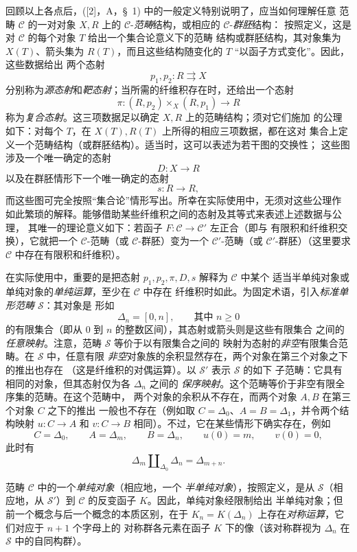 回顾以上各点后，([2]，A，\S~1) 中的一般定义特别说明了，应当如何理解任意
范畴 $\mathcal C$ 的一对对象 $X,R$ 上的
$\mathcal C$-\emph{范畴}结构，或相应的 $\mathcal C$-\emph{群胚}结构：
按照定义，这是对 $\mathcal C$ 的每个对象 $T$ 给出一个集合论意义下的范畴
结构或群胚结构，其对象集为 $X(T)$、箭头集为 $R(T)$，而且这些结构随变化的
$T$ “以函子方式变化”。因此，这些数据给出
两个态射
\[
  p_1,p_2:R\rightrightarrows X
\]
分别称为\emph{源态射}和\emph{靶态射}；当所需的纤维积存在时，还给出一个态射
\[
  \pi:(R,p_2)\times_X(R,p_1)\longrightarrow R
\]
称为\emph{复合态射}。这三项数据足以确定 $X,R$ 上的范畴结构；须对它们施加
的公理如下：对每个 $T$，在 $X(T),R(T)$ 上所得的相应三项数据，都在这对
集合上定义一个范畴结构（或群胚结构）。适当时，这可以表述为若干图的交换性；
这些图涉及一个唯一确定的态射
\[
  D:X\longrightarrow R
\]
以及在群胚情形下一个唯一确定的态射
\[
  s:R\longrightarrow R,
\]
而这些图可完全按照“集合论”情形写出。所幸在实际使用中，无须对这些公理作
如此繁琐的解释。能够借助某些纤维积之间的态射及其等式来表述上述数据与公理，
其唯一的理论意义如下：若函子 $F:\mathcal C\to\mathcal C'$ 左正合（即与
有限积和纤维积交换），它就把一个 $\mathcal C$-范畴（或
$\mathcal C$-群胚）变为一个 $\mathcal C'$-范畴（或
$\mathcal C'$-群胚）（这里要求 $\mathcal C$ 中存在有限积和纤维积）。

在实际使用中，重要的是把态射 $p_1,p_2,\pi,D,s$ 解释为 $\mathcal C$ 中某个
适当半单纯对象或单纯对象的\emph{单纯运算}，至少在 $\mathcal C$ 中存在
纤维积时如此。为固定术语，引入\emph{标准单形范畴 $\mathcal S$}：其对象是
形如
\[
  \Delta_n=[0,n],\qquad\text{其中 }n\geq 0
\]
的有限集合（即从 $0$ 到 $n$ 的整数区间），其态射或箭头则是这些有限集合
之间的\emph{任意映射}。注意，范畴 $\mathcal S$ 等价于以有限集合之间的
映射为态射的\emph{非空}有限集合范畴。在 $\mathcal S$ 中，任意有限
\emph{非空}对象族的余积显然存在，两个对象在第三个对象之下的推出也存在
（这是纤维积的对偶运算）。以 $\mathcal S'$ 表示 $\mathcal S$ 的如下
子范畴：它具有相同的对象，但其态射仅为各 $\Delta_n$ 之间的
\emph{保序映射}。这个范畴等价于非空有限全序集的范畴。在这个范畴中，
两个对象的余积从不存在，而两个对象 $A,B$ 在第三个对象 $C$ 之下的推出
一般也不存在（例如取 $C=\Delta_0$、$A=B=\Delta_1$，并令两个结构映射
$u:C\to A$ 和 $v:C\to B$ 相同）。不过，它在某些情形下确实存在，例如
\[
  C=\Delta_0,\qquad A=\Delta_m,\qquad B=\Delta_n,\qquad
  u(0)=m,\qquad v(0)=0,
\]
此时有
\[
  \Delta_m\amalg_{\Delta_0}\Delta_n=\Delta_{m+n}.
\]

范畴 $\mathcal C$ 中的一个\emph{单纯对象}（相应地，一个
\emph{半单纯对象}），按照定义，是从 $\mathcal S$（相应地，从
$\mathcal S'$）到 $\mathcal C$ 的反变函子 $K$。因此，单纯对象经限制给出
半单纯对象；但前一个概念与后一个概念的本质区别，在于
$K_n=K(\Delta_n)$ 上存在\emph{对称运算}，它们对应于 $n+1$ 个字母上的
对称群各元素在函子 $K$ 下的像（该对称群视为 $\Delta_n$ 在
$\mathcal S$ 中的自同构群）。

